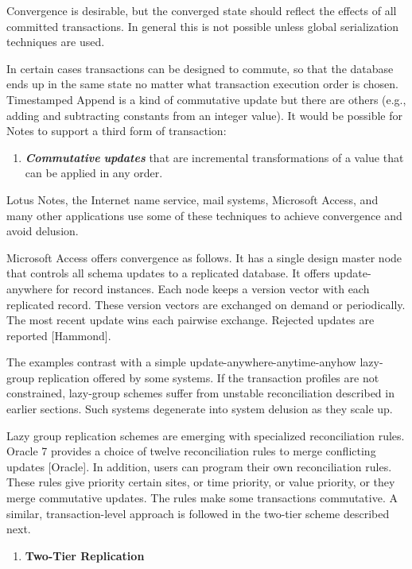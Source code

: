 \documentclass[a4paper,11pt,twoside,openright]{article}
\begin{document}
Convergence is desirable, but the converged state should reflect the
effects of all committed transactions. In general this is not possible
unless global serialization techniques are used.

In certain cases transactions can be designed to commute, so that the
database ends up in the same state no matter what transaction execution
order is chosen. Timestamped Append is a kind of commutative update but
there are others (e.g., adding and subtracting constants from an integer
value). It would be possible for Notes to support a third form of
transaction:

\begin{enumerate}
\def\labelenumi{\arabic{enumi}.}
\setcounter{enumi}{2}
\item
  \emph{\textbf{Commutative}} \emph{\textbf{updates}} that are
  incremental transformations of a value that can be applied in any
  order.
\end{enumerate}

Lotus Notes, the Internet name service, mail systems, Microsoft Access,
and many other applications use some of these techniques to achieve
convergence and avoid delusion.

Microsoft Access offers convergence as follows. It has a single design
master node that controls all schema updates to a replicated database.
It offers update-anywhere for record instances. Each node keeps a
version vector with each replicated record. These version vectors are
exchanged on demand or periodically. The most recent update wins each
pairwise exchange. Rejected updates are reported {[}Hammond{]}.

The examples contrast with a simple update-anywhere-anytime-anyhow
lazy-group replication offered by some systems. If the transaction
profiles are not constrained, lazy-group schemes suffer from unstable
reconciliation described in earlier sections. Such systems degenerate
into system delusion as they scale up.

Lazy group replication schemes are emerging with specialized
reconciliation rules. Oracle 7 provides a choice of twelve
reconciliation rules to merge conflicting updates {[}Oracle{]}. In
addition, users can program their own reconciliation rules. These rules
give priority certain sites, or time priority, or value priority, or
they merge commutative updates. The rules make some transactions
commutative. A similar, transaction-level approach is followed in the
two-tier scheme described next.

\begin{enumerate}
\def\labelenumi{\arabic{enumi}.}
\setcounter{enumi}{6}
\item
  \textbf{Two-Tier Replication }
\end{enumerate}
\end{document}
